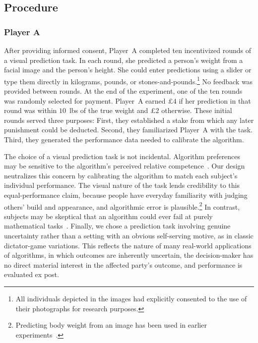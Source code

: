 \subsection*{Procedure}

\subsubsection*{Player A}

After providing informed consent, Player~A completed ten incentivized rounds of a visual prediction task. In each round, she predicted a person's weight from a facial image and the person's height. She could enter predictions using a slider or type them directly in kilograms, pounds, or stones-and-pounds.\footnote{All individuals depicted in the images had explicitly consented to the use of their photographs for research purposes.}  No feedback was provided between rounds. At the end of the experiment, one of the ten rounds was randomly selected for payment. Player~A earned $\pounds 4$ if her prediction in that round was within $10$~lbs of the true weight and $\pounds 2$ otherwise. These initial rounds served three purposes: First, they established a stake from which any later punishment could be deducted. Second, they familiarized Player~A with the task. Third, they generated the performance data needed to calibrate the algorithm.

The choice of a visual prediction task is not incidental. Algorithm preferences may be sensitive to the algorithm's perceived relative competence~\citep{qin_ai_2025,logg_algorithm_2019}. Our design neutralizes this concern by calibrating the algorithm to match each subject's individual performance. The visual nature of the task lends credibility to this equal-performance claim, because people have everyday familiarity with judging others' build and appearance, and algorithmic error is plausible.\footnote{Predicting body weight from an image has been used in earlier experiments~\citep{logg_algorithm_2019}.} In contrast, subjects may be skeptical that an algorithm could ever fail at purely mathematical tasks~\citep{gogoll_rage_2018,feier_hiding_2022}. Finally, we chose a prediction task involving genuine uncertainty rather than a setting with an obvious self-serving motive, as in classic dictator-game variations. %
This reflects the nature of many real-world applications of algorithms, in which outcomes are inherently uncertain, the decision-maker has no direct material interest in the affected party's outcome, and performance is evaluated ex post.


